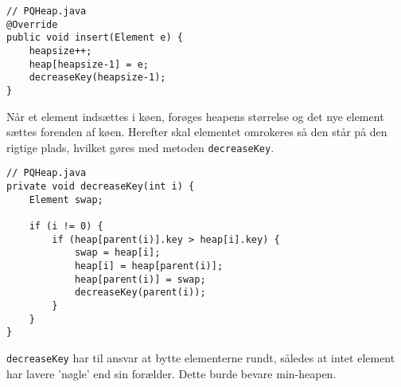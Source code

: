 \documentclass{article}
\begin{document}
\begin{lstlisting}
// PQHeap.java
@Override
public void insert(Element e) {
    heapsize++;
    heap[heapsize-1] = e;
    decreaseKey(heapsize-1);
}
\end{lstlisting}
Når et element indsættes i køen, forøges heapens størrelse og det nye element sættes forenden af køen. Herefter skal elementet omrokeres så den står på den rigtige plads, hvilket gøres med metoden \texttt{decreaseKey}.
\newpage
\begin{lstlisting}
// PQHeap.java
private void decreaseKey(int i) {
    Element swap;

    if (i != 0) {
        if (heap[parent(i)].key > heap[i].key) {
            swap = heap[i];
            heap[i] = heap[parent(i)];
            heap[parent(i)] = swap;
            decreaseKey(parent(i));
        }
    }
}
\end{lstlisting}
\texttt{decreaseKey} har til ansvar at bytte elementerne rundt, således at intet element har lavere 'nøgle' end sin forælder. Dette burde bevare min-heapen.

\newpage
\end{document}
